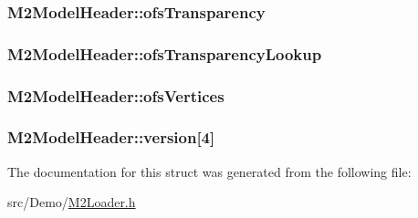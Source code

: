 \hypertarget{struct_m2_model_header_a76bd705b5bcb176a3629ac402875468e}{
\subsubsection[{ofs\+Transparency}]{ M2\+Model\+Header\+::ofs\+Transparency}}\label{struct_m2_model_header_a76bd705b5bcb176a3629ac402875468e}
\hypertarget{struct_m2_model_header_ad333925726bc0672d6c05f03461423bb}{
\subsubsection[{ofs\+Transparency\+Lookup}]{ M2\+Model\+Header\+::ofs\+Transparency\+Lookup}}\label{struct_m2_model_header_ad333925726bc0672d6c05f03461423bb}
\hypertarget{struct_m2_model_header_a71fd82cfe44dd38d5e86309134a88a23}{
\subsubsection[{ofs\+Vertices}]{ M2\+Model\+Header\+::ofs\+Vertices}}\label{struct_m2_model_header_a71fd82cfe44dd38d5e86309134a88a23}
\hypertarget{struct_m2_model_header_abc5ecbfc181df8f85601867c1babd152}{
\subsubsection[{version}]{ M2\+Model\+Header\+::version\mbox{[}4\mbox{]}}}\label{struct_m2_model_header_abc5ecbfc181df8f85601867c1babd152}


The documentation for this struct was generated from the following file\+:\begin{DoxyCompactItemize}
\item 
src/\+Demo/\hyperlink{_m2_loader_8h}{M2\+Loader.\+h}\end{DoxyCompactItemize}
